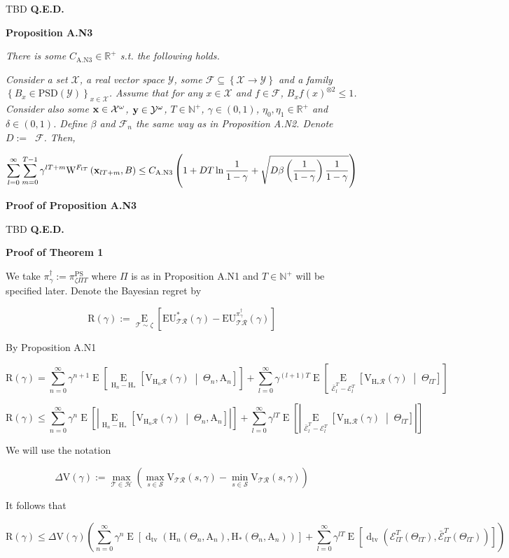 \documentclass[a4paper]{article}
\newcommand{\Co}[1]{}
\newcommand{\AP}[1]{\left(#1\right)}
\newcommand{\AB}[1]{\left[#1\right]}
\newcommand{\AC}[1]{\left\{#1\right\}}
\newcommand{\ABM}[2]{\left[#1\;\middle\vert\;#2\right]}
\newcommand{\Ea}[2]{\underset{#1}{\operatorname{E}}\AB{#2}}
\newcommand{\CE}[3]{\underset{#1}{\operatorname{E}}\ABM{#2}{#3}}
\newcommand{\Dtva}[1]{\operatorname{d}_{\text{tv}}\AP{#1}}
\newcommand{\Nats}{\mathbb{N}}
\newcommand{\Reals}{\mathbb{R}}
\newcommand{\PSD}{\mathrm{PSD}}
\newcommand{\Abs}[1]{\left\vert #1 \right\vert}
\newcommand{\B}{B}
\newcommand{\X}{\mathcal{X}}
\newcommand{\Y}{\mathcal{Y}}
\newcommand{\F}{\mathcal{F}}
\newcommand{\St}{\mathcal{S}}
\newcommand{\R}{\mathcal{R}}
\newcommand{\T}{\mathcal{T}}
\newcommand{\Hy}{\mathcal{H}}
\DeclareMathOperator{\RVO}{\dim_{RVO}}
\newcommand{\V}{\mathrm{V}}
\newcommand{\EU}{\mathrm{EU}}
\newcommand{\Reg}{\mathrm{R}}
\newcommand{\PSR}{\text{PS}}
\newcommand{\W}{\mathrm{W}}
\newcommand{\AT}{\mathrm{A}}
\newcommand{\THy}{\mathrm{H}_*}
\newcommand{\SHy}{\mathrm{H}}
\newcommand{\Ev}{\mathcal{E}}
\newcommand{\De}{\Delta}
\begin{document}
TBD \textbf{Q.E.D.}\Co{b}

\textbf{Proposition A.N3}\Co{b}

\textit{There is some $C_{\mathrm{A.N3}}\in\Reals^+$ s.t. the following holds.}\Co{i}

\textit{Consider a set $\X$, a real vector space $\Y$, some $\F\subseteq\AC{\X\rightarrow\Y}$ and a family $\AC{\B _x\in\PSD(\Y)}_{x\in\X}$. Assume that for any $x\in\X$ and $f\in\F$, $\B _x{f(x)}^{\otimes2}\leq 1$. Consider also some $\bold{x}\in\X^\omega$, $\bold{y}\in\Y^\omega$, $T\in\Nats^+$, $\gamma\in(0,1)$, $\eta_0,\eta_1\in\Reals^+$ and $\delta\in(0,1)$. Define $\beta$ and $\F_n$ the same way as in Proposition A.N2. Denote $D:=\RVO{\F}$. Then,}\Co{i}

$$\sum_{l=0}^\infty\sum_{m=0}^{T-1}{\gamma^{lT+m}\W^{F_{lT}}\AP{\bold{x}_{lT+m},B}} \leq C_{\mathrm{A.N3}}\AP{1+D T\ln\frac{1}{1-\gamma}+\sqrt{D\beta\AP{\frac{1}{1-\gamma}}\frac{1}{1-\gamma}}}$$

\textbf{Proof of Proposition A.N3}\Co{b}

TBD \textbf{Q.E.D.}\Co{b}

\textbf{Proof of Theorem 1}\Co{b}

We take $\pi^\dagger_\gamma:=\pi^\PSR_{\zeta\Pi T}$ where $\Pi$ is as in Proposition A.N1 and $T\in\Nats^+$ will be specified later. Denote the Bayesian regret by

$$\Reg(\gamma):=\Ea{\T\sim\zeta}{\EU^*_{\T\R}(\gamma)-\EU^{\pi_{\gamma}^{\dagger}}_{\T\R}(\gamma)}$$

By Proposition A.N1

$$\Reg(\gamma)=\sum_{n=0}^\infty\gamma^{n+1}\Ea{}{\CE{\SHy_n-\THy}{\V_{\SHy_n\R}(\gamma)}{\Theta_n,\AT_n}}+\sum_{l=0}^\infty{\gamma^{(l+1)T}}\Ea{}{\CE{\bar{\Ev}_{l}^T-\Ev_{l}^T}{\V_{\SHy_*\R}(\gamma)}{\Theta_{lT}}}$$

$$\Reg(\gamma)\leq\sum_{n=0}^\infty\gamma^{n}\Ea{}{\Abs{\CE{\SHy_n-\THy}{\V_{\SHy_n\R}(\gamma)}{\Theta_n,\AT_n}}}+\sum_{l=0}^\infty{\gamma^{lT}}\Ea{}{\Abs{\CE{\bar{\Ev}_{l}^T-\Ev_{l}^T}{\V_{\SHy_*\R}(\gamma)}{\Theta_{lT}}}}$$

We will use the notation

$$\De\V(\gamma):=\max_{\T\in\Hy}{\AP{\max_{s\in\St}{\V_{\T\R}(s,\gamma)}-\min_{s\in\St}{\V_{\T\R}(s,\gamma)}}}$$

It follows that

$$\Reg(\gamma)\leq\Delta\V(\gamma)\AP{\sum_{n=0}^\infty\gamma^{n}\Ea{}{\Dtva{\SHy_n\AP{\Theta_n,\AT_n},\THy\AP{\Theta_n,\AT_n}} }+\sum_{l=0}^\infty\gamma^{lT}\Ea{}{\Dtva{\Ev_{lT}^T\AP{\Theta_{lT}},\bar{\Ev}_{lT}^T\AP{\Theta_{lT}}}}}$$
\end{document}
